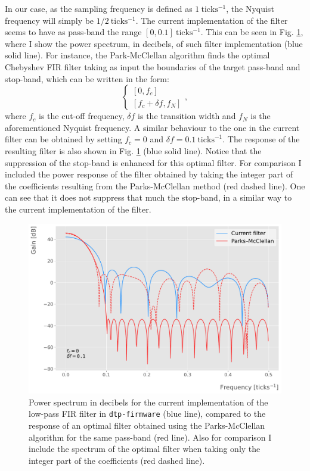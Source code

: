 In our case, as the sampling frequency is defined as $1 \ \mathrm{ticks^{-1}}$, the Nyquist frequency will simply be $1/2 \ \mathrm{ticks^{-1}}$. The current implementation of the filter seems to have as pass-band the range $[0,0.1] \ \mathrm{ticks^{-1}}$. This can be seen in Fig. \ref{fig:filter_comp}, where I show the power spectrum, in decibels, of such filter implementation (blue solid line). For instance, the Park-McClellan algorithm finds the optimal Chebyshev FIR filter \cite{Weinberg1960} taking as input the boundaries of the target pass-band and stop-band, which can be written in the form:
\begin{equation}
	\left\{ \begin{array}{c}
		\left[0, f_{c}\right] \\
		\left[ f_{c} + \delta f, f_{N}\right]
	\end{array} \right. ,
\end{equation}
where $f_{c}$ is the cut-off frequency, $\delta f$ is the transition width and $f_{N}$ is the aforementioned Nyquist frequency. A similar behaviour to the one in the current filter can be obtained by setting $f_{c} = 0$ and $\delta f = 0.1 \ \mathrm{ticks}^{-1}$. The response of the resulting filter is also shown in Fig. \ref{fig:filter_comp} (blue solid line). Notice that the suppression of the stop-band is enhanced for this optimal filter. For comparison I included the power response of the filter obtained by taking the integer part of the coefficients resulting from the Parks-McClellan method (red dashed line). One can see that it 
does not suppress that much the stop-band, in a similar way to the current implementation of the filter.

\begin{figure}[h!]
	\centering
	\includegraphics[width=0.8\linewidth]{Images/Matched_Filter/filter_comp}
	\caption[Power spectra for the current low-pass FIR filter and the optimal filter obtained using the Parks-McClellan algorithm.]{Power spectrum in decibels for the current implementation of the low-pass FIR filter in \texttt{dtp-firmware} (blue line), compared to the response of an optimal filter obtained using the Parks-McClellan algorithm for the same pass-band (red line). Also for comparison I include the spectrum of the optimal filter when taking only the integer part of the coefficients (red dashed line).}
	\label{fig:filter_comp}
\end{figure}

